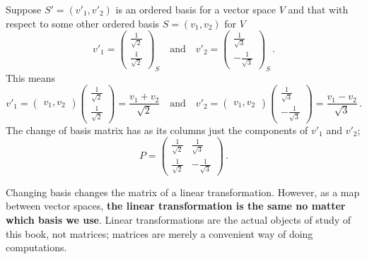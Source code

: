 \begin{example}
Suppose  $S'=(v'_1,v'_2)$ is an ordered  basis for a vector space $V$ and that with respect to some other ordered basis $S=(v_1, v_2)$ for $V$ 
\[
v'_1=
\begin{pmatrix}
\frac{1}{\sqrt{2}}\\\frac{1}{\sqrt{2}}
\end{pmatrix} _S
\quad \mbox{and} \quad 
v'_2=
\begin{pmatrix}
\frac{1}{\sqrt{3}}\\-\frac{1}{\sqrt{3}}
\end{pmatrix}_S  \, .
\]
%
This means 
\[
v'_1=\begin{pmatrix}v_1 , v_2 \end{pmatrix}\begin{pmatrix}
\frac{1}{\sqrt{2}}\\ \frac{1}{\sqrt{2}}
\end{pmatrix}
=\frac{v_1+v_2}{\sqrt{2}}\quad\mbox{and}\quad
v'_2=\begin{pmatrix}v_1 , v_2 \end{pmatrix}\begin{pmatrix}
\frac{1}{\sqrt{3}}\\-\frac{1}{\sqrt{3}}
\end{pmatrix}
=\frac{v_1-v_2}{\sqrt{3}}\, .
\]
The change of basis matrix has as its columns just the components of $v'_1$ and $v'_2$;
\[
P= \begin{pmatrix}
\frac{1}{\sqrt{2}}&\frac{1}{\sqrt{3}}\\
\frac{1}{\sqrt{2}}&-\frac{1}{\sqrt{3}}
\end{pmatrix}\, .
\]
\end{example}


\vspace{1mm}


Changing basis changes the matrix of a linear transformation. However, as a map between vector spaces, {\bfseries the linear transformation is the same no matter which basis we use}. Linear transformations are the actual objects of study of this book, not matrices; matrices are merely a convenient way of doing computations.


